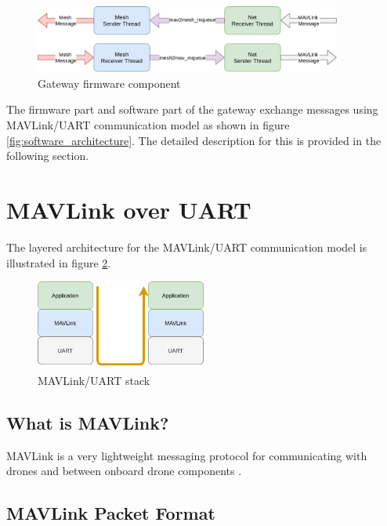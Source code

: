 \documentclass[\main/thesis.tex]{subfiles}
\begin{document}
\begin{figure}[H]
    \begin{center}
        \includegraphics[width=0.9\textwidth]{gateway_firmware.png}
    \end{center}
    \caption{Gateway firmware component}
    \label{fig:gateway_firmware}
\end{figure}

The firmware part and software part of the gateway exchange messages using MAVLink/UART communication model as shown in figure \ref{fig:software_architecture}. The detailed description for this is provided in the following section.

\section{MAVLink over UART}
The layered architecture for the MAVLink/UART communication model is illustrated in figure \ref{fig:mavlink_uart_stack}.
\begin{figure}[H]
    \begin{center}
        \includegraphics[width=0.5\textwidth]{MAVLink_over_UART.png}
    \end{center}
    \caption{MAVLink/UART stack}
    \label{fig:mavlink_uart_stack}
\end{figure}

\subsection{What is MAVLink?}
MAVLink is a very lightweight messaging protocol for communicating with drones and between onboard drone components \cite{web_mavlink}.

\subsection{MAVLink Packet Format}
\end{document}
